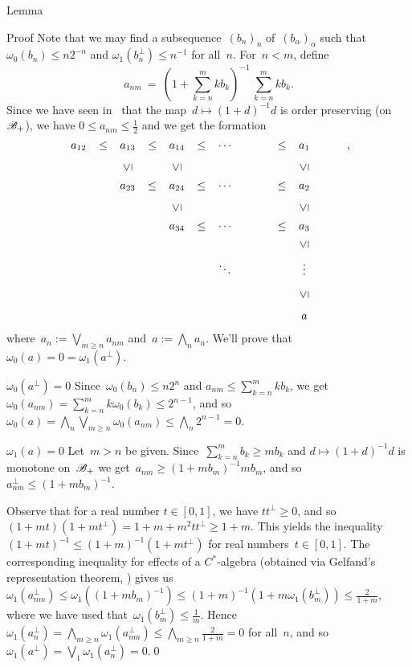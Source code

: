 \documentclass[a]{subfiles}
\begin{document}
\begin{parsec}
\begin{point}{Lemma}
\begin{point}{Proof}
Note that we may find a subsequence~$(b_n)_n$ of~$(b_\alpha)_\alpha$
such that $\omega_0( b_n ) 
\leq n2^{-n}$
and $\omega_1(b_n^\perp)\leq n^{-1}$
for all~$n$.
For~$n < m$, define
\begin{equation*}
\textstyle
a_{nm}\ = \ (1+\sum_{k=n}^m kb_k)^{-1} \,\sum_{k=n}^m kb_k.
\end{equation*}
Since we have seen in~\sref{}
that the map~$d\mapsto (1+d)^{-1}d$ is order preserving
(on~$\mathscr{B}_{+}$),
we have $0\leq a_{nm}\leq \frac{1}{2}$
and we get the formation
\begin{equation*}
\renewcommand{\labelstyle}{\textstyle}
\xymatrix{
a_{12}\ar@{}|-{\leq}[r] & 
a_{13}\ar@{}|-{\leq}[r] & 
a_{14}\ar@{}|-{\leq}[r]  & 
\dotsb & \ar@{}|-{\leq}[r]& a_1 \\
&
a_{23} \ar@{}|-{\leq}[r] \ar@{}[u]|-{\uleq} &
a_{24} \ar@{}|-{\leq}[r]  \ar@{}[u]|-{\uleq} &
\dotsb &\ar@{}|-{\leq}[r]& a_2  \ar@{}[u]|-{\uleq} \\
&
&
a_{34} \ar@{}|-{\leq}[r]  \ar@{}[u]|-{\uleq} & 
\dotsb & \ar@{}|-{\leq}[r] & a_3  \ar@{}[u]|-{\uleq} 
\\
&&&\ddots&&\vdots \ar@{}[u]|-{\uleq}& \\
&&&&&a\ar@{}[u]|-{\uleq}
},
\end{equation*}
where~$a_n:= \bigvee_{m\geq n} a_{nm}$
and~$a := \bigwedge_n a_n$.
We'll prove that~$\omega_0(a)=0=\omega_1(a^\perp)$.
\begin{point}{$\omega_0(a^\perp)=0$}%
Since~$\omega_0(b_n)\leq n2^n$ 
and $a_{nm}\leq \sum_{k=n}^m k b_k$,
we get~$\omega_0(a_{nm})=\sum_{k=n}^m k\omega_0(b_k) \leq 2^{n-1}$,
and so $\omega_0(a)=\bigwedge_n\bigvee_{m\geq n} \omega_0(a_{nm})
\leq \bigwedge_n 2^{n-1} = 0$.
\end{point}
\begin{point}{$\omega_1(a)=0$}%
Let~$m> n$ be given.
Since~$\sum_{k=n}^m b_k \geq mb_k$
and $d\mapsto (1+d)^{-1}d$
is monotone on~$\mathscr{B}_{+}$
we get~$a_{nm} \geq (1+mb_m)^{-1} mb_m$,
and so~$a_{nm}^\perp \leq (1+mb_m)^{-1}$.

Observe that for a real number $t\in[0,1]$,
we have $tt^\perp \geq 0$,
and so $(1+mt)(1+mt^\perp) = 1+m+m^2tt^\perp \geq 1+m$.
This yields the inequality $(1+mt)^{-1}\leq (1+m)^{-1}(1+mt^\perp)$
for real numbers~$t\in[0,1]$.
The corresponding inequality for effects of a $C^*$-algebra
(obtained via Gelfand's representation theorem, )
gives us $\omega_1(a_{nm}^\perp)\leq \omega_1((1+mb_m)^{-1})
\leq (1+m)^{-1}(1+m\omega_1(b_m^\perp))\leq \frac{2}{1+m}$,
where we have used that~$\omega_1(b_m^\perp)\leq \frac{1}{m}$.
Hence~$\omega_1(a_n^\perp)=\bigwedge_{m\geq n} \omega_1(a_{nm}^\perp)
\leq \bigwedge_{m\geq n} \frac{2}{1+m}=0$ for all~$n$,
and so~$\omega_1(a^\perp)=\bigvee_1\omega_1(a_n^\perp)=0$.\qed
\end{point}
\end{point}



\end{point}
\end{parsec}
\end{document}
